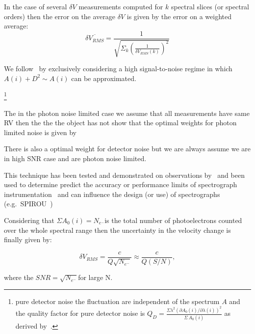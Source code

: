In the case of several \(\delta V\) measurements computed for \(k\) spectral slices (or spectral orders) then the error on the average \(\delta V\) is given by the error on a weighted average:
\begin{equation}
\overline{\delta {V}_{RMS}} = \frac{1}{\sqrt{\Sigma_k{{(\frac{1}{\delta V_{RMS}(k)})}^{2}}}}
\end{equation}


We follow~\cite{figueira_radial_2016} by exclusively considering a high signal-to-noise regime in which \(A(i) + D^{2} \sim A(i)\) can be approximated.


\footnote{pure detector noise the fluctuation are independent of the spectrum \(A\) and the quality factor for pure detector noise is \(Q_D = \frac{\Sigma{\lambda^{2} {(\partial A_0(i)/\partial \lambda(i))}^{2}}}{\Sigma{\, A_0(i)}}\) as derived by~\cite{connes_absolute_1985}. }

The in the photon noise limited case we assume that all measurements have same {RV} then the the the object has not
\citet{connes_absolute_1985} show that the optimal weights for photon limited noise is given by 

There is also a optimal weight for detector noise but we are always assume we are in high {SNR} case and are photon noise limited.


This technique has been tested and demonstrated on observations by~\citet{connes_demonstration_1996} and been used to determine predict the accuracy or performance limits of spectrograph instrumentation~\citet{connes_absolute_1985,bouchy_fundamental_2001} and can influence the design (or use) of spectrographs
 (e.g.\ SPIROU~\citep{artigau_spirou_2014,figueira_radial_2016})


Considering that \(\Sigma{A_0(i)} = N_{e^-}\)is the total number of photoelectrons counted over the whole spectral range then the uncertainty in the velocity change is finally given by:

\begin{equation}
\delta V_{RMS} = \frac{c}{Q \sqrt{N_{e^-}}} \approx \frac{c}{Q (S/N)}, \label{eq:rv_SNR}
\end{equation}

where the \({SNR}=\sqrt{N_{e^-}}\)for large N. 




